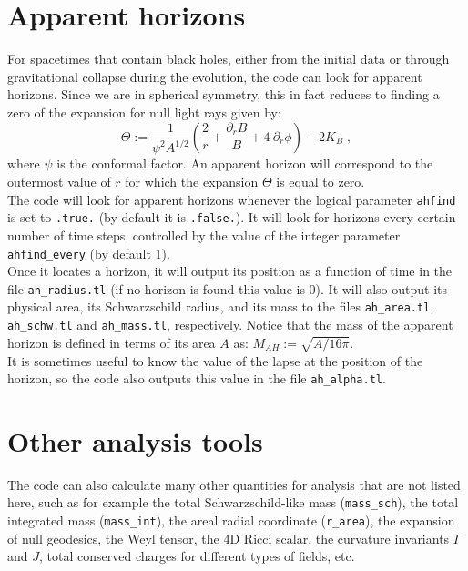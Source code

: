\documentclass[12pt]{article}
\begin{document}
\setcounter{equation}{0}
\section{Apparent horizons}
\label{sec:horizons}

For spacetimes that contain black holes, either from the initial data
or through gravitational collapse during the evolution, the code can
look for apparent horizons.  Since we are in spherical symmetry, this
in fact reduces to finding a zero of the expansion for null light rays
given by:
\begin{equation}
\Theta := \frac{1}{\psi^2 A^{1/2}} \left( \frac{2}{r} + \frac{\partial_r B}{B}
+ 4 \: \partial_r \phi \right) - 2 K_B \; ,
\end{equation}
where $\psi$ is the conformal factor.  An apparent horizon will
correspond to the outermost value of $r$ for which the expansion
$\Theta$ is equal to zero. \\

The code will look for apparent horizons whenever the logical
parameter \texttt{ahfind} is set to \texttt{.true.} (by default it is
\texttt{.false.}).  It will look for horizons every certain number of
time steps, controlled by the value of the integer parameter
\texttt{ahfind\_every} (by default 1). \\

Once it locates a horizon, it will output its position as a function
of time in the file \texttt{ah\_radius.tl} (if no horizon is found
this value is 0). It will also output its physical area, its
Schwarzschild radius, and its mass to the files \texttt{ah\_area.tl},
\texttt{ah\_schw.tl} and \texttt{ah\_mass.tl}, respectively.  Notice
that the mass of the apparent horizon is defined in terms of its area
$A$ as: $M_{AH} := \sqrt{ A/16 \pi}$. \\

It is sometimes useful to know the value of the lapse at the position
of the horizon, so the code also outputs this value in the file
\texttt{ah\_alpha.tl}. \\



\setcounter{equation}{0}
\section{Other analysis tools}
\label{sec:analysis}

The code can also calculate many other quantities for analysis that
are not listed here, such as for example the total Schwarzschild-like
mass (\texttt{mass\_sch}), the total integrated mass
(\texttt{mass\_int}), the areal radial coordinate (\texttt{r\_area}),
the expansion of null geodesics, the Weyl tensor, the 4D Ricci scalar,
the curvature invariants $I$ and $J$, total conserved charges for
different types of fields, etc. \\
\end{document}
